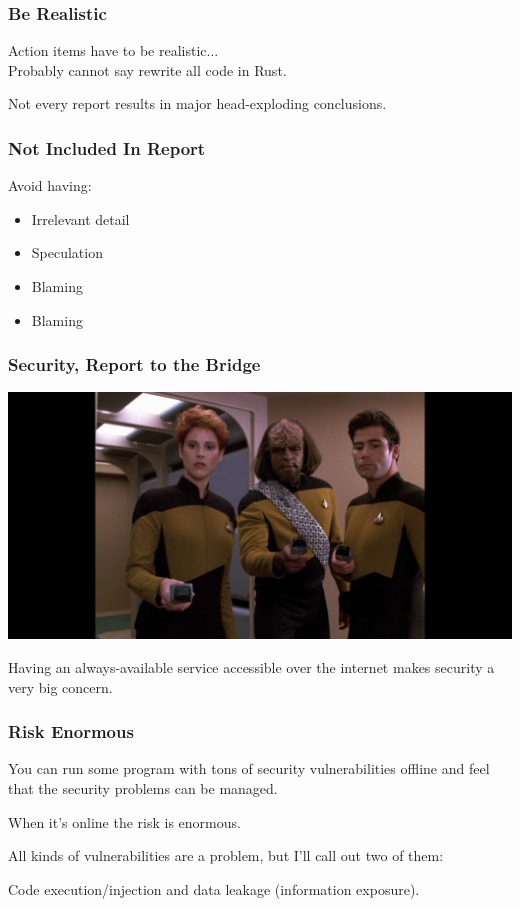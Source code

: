 \begin{frame}
\frametitle{Be Realistic}

Action items have to be realistic...\\
\quad Probably cannot say rewrite all code in Rust.

Not every report results in major head-exploding conclusions.

\end{frame}


\begin{frame}
\frametitle{Not Included In Report}

Avoid having:

\begin{itemize}
	\item Irrelevant detail
	\item Speculation
	\item Blaming
	\item Blaming
\end{itemize}


\end{frame}




\begin{frame}
\frametitle{Security, Report to the Bridge}

\begin{center}
	\includegraphics[width=\textwidth]{images/securityteam.jpg}
\end{center}

Having an always-available service accessible over the internet makes security a very big concern.

\end{frame}

\begin{frame}
\frametitle{Risk Enormous}

You can run some program with tons of security vulnerabilities offline and feel that the security problems can be managed. 

When it's online the risk is enormous. 

All kinds of vulnerabilities are a problem, but I'll call out two of them:

Code execution/injection and data leakage (information exposure). 


\end{frame}


